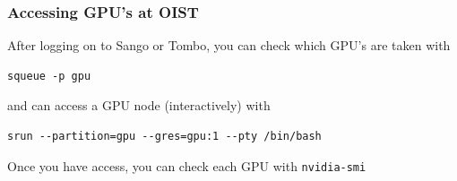 \documentclass{beamer}
\begin{document}
\begin{frame}[fragile]
\frametitle{Accessing GPU's at OIST}

After logging on to Sango or Tombo, you can check which GPU's are taken with 

\begin{lstlisting}
squeue -p gpu
\end{lstlisting}

and can access a GPU node (interactively) with

\begin{lstlisting}
srun --partition=gpu --gres=gpu:1 --pty /bin/bash
\end{lstlisting}

Once you have access, you can check each GPU with \texttt{nvidia-smi}
\end{frame}
\end{document}
